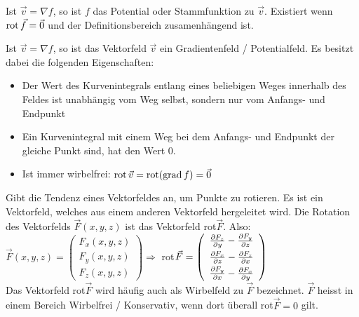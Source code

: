 \begin{definition}[Potential]
Ist $\vec{v} = \nabla f$, so ist $f$ das Potential oder Stammfunktion zu $\vec{v}$.
Existiert wenn $\operatorname{rot} \vec{f} = \vec{0}$ und der Definitionsbereich zusamenhängend ist.
\end{definition}

\begin{definition}
Ist $\vec{v} = \nabla f$, so ist das Vektorfeld $\vec{v}$
ein Gradientenfeld / Potentialfeld. Es besitzt dabei die folgenden
Eigenschaften:
\begin{itemize}
	\item Der Wert des Kurvenintegrals entlang eines beliebigen Weges innerhalb des
	Feldes ist unabhängig vom Weg selbst, sondern nur vom Anfangs- und Endpunkt
	\item Ein Kurvenintegral mit einem Weg bei dem Anfangs- und Endpunkt der
	gleiche Punkt sind, hat den Wert 0.
	\item Ist immer wirbelfrei: $\operatorname{rot} \vec{v} = \operatorname{rot}(\operatorname{grad} f) = \vec{0}$
\end{itemize}
\end{definition}

\begin{definition}
Gibt die Tendenz eines Vektorfeldes an, um Punkte zu rotieren. Es ist ein Vektorfeld, welches aus einem anderen Vektorfeld hergeleitet wird. Die Rotation des Vektorfelds $\vec{F} (x, y, z)$ ist das Vektorfeld rot$\vec{F}$. Also: 
$\vec{F} (x, y, z) = 
\left(
	\begin{array}{c}
		F_x (x, y, z) \\
		F_y (x, y, z) \\
		F_z (x, y, z)
	\end{array}
\right) \Rightarrow$
 rot$\vec{F} = 
\left(
	\begin{array}{c}
		\vspace{3pt} \frac{\partial F_z}{\partial y} - \frac{\partial F_y}{\partial z} \\
		\vspace{3pt} \frac{\partial F_x}{\partial z} - \frac{\partial F_z}{\partial x} \\
		\frac{\partial F_y}{\partial x} - \frac{\partial F_x}{\partial y}
	\end{array}
\right)$\\
Das Vektorfeld rot$\vec{F}$ wird häufig auch als Wirbelfeld zu $\vec{F}$ bezeichnet. $\vec{F}$ heisst in einem Bereich Wirbelfrei / Konservativ, wenn dort überall rot$\vec{F} = 0$ gilt.
\end{definition}

